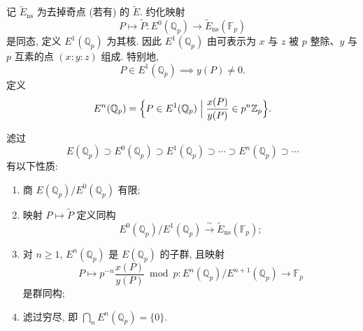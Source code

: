 记 $\tilde{E}_{\mathrm{ns}}$ 为去掉奇点 (若有) 的 $\tilde{E}$. 约化映射
\[
P\mapsto\tilde{P}\colon E^0(\mathbb{Q}_p)\to\tilde{E}_{\mathrm{ns}}(\mathbb{F}_p)
\]
是同态, 定义 $E^1(\mathbb{Q}_p)$ 为其核. 因此 $E^1(\mathbb{Q}_p)$ 由可表示为 $x$ 与 $z$ 被 $p$ 整除、$y$ 与 $p$ 互素的点 $(x:y:z)$ 组成. 特别地,
\[
P\in E^1(\mathbb{Q}_p) \implies y(P)\neq 0.
\]
定义
\[
E^n(\mathbb{Q}_p) = \Bigl\{P\in E^1(\mathbb{Q}_p) \;\Big|\; \frac{x(P)}{y(P)}\in p^n\mathbb{Z}_p\Bigr\}.
\]

\begin{theorem} \label{thm:2.4.1} 
滤过
\[
E(\mathbb{Q}_p)\supset E^0(\mathbb{Q}_p)\supset E^1(\mathbb{Q}_p)\supset\cdots\supset E^n(\mathbb{Q}_p)\supset\cdots
\]
有以下性质:
\begin{enumerate}[label=\textup{(\alph*)}]
\item 商 $E(\mathbb{Q}_p)/E^0(\mathbb{Q}_p)$ 有限;
\item 映射 $P\mapsto\tilde{P}$ 定义同构
\[
E^0(\mathbb{Q}_p)/E^1(\mathbb{Q}_p) \xrightarrow{\ \sim\ }\tilde{E}_{\mathrm{ns}}(\mathbb{F}_p);
\]
\item 对 $n\ge 1$, $E^n(\mathbb{Q}_p)$ 是 $E(\mathbb{Q}_p)$ 的子群, 且映射
\[
P\mapsto p^{-n}\frac{x(P)}{y(P)}\bmod p\colon E^n(\mathbb{Q}_p)/E^{n+1}(\mathbb{Q}_p)\to\mathbb{F}_p
\]
是群同构;
\item 滤过穷尽, 即 $\bigcap_n E^n(\mathbb{Q}_p) = \{0\}$.
\end{enumerate}
\end{theorem}


